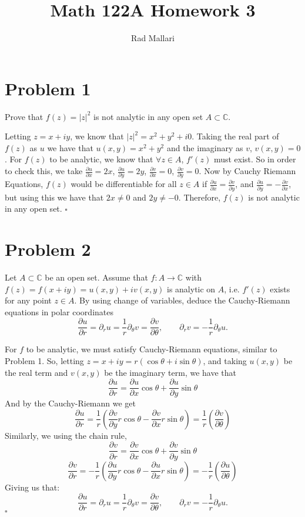 \documentclass[12pt]{article}
\title{Math 122A Homework 3}
\author{Rad Mallari}
\newcommand{\C}{\mathbb{C}}
\newenvironment{proof}{\noindent{\bf Proof.}}{\hfill $\square$\medskip}
\begin{document}
\maketitle

\section{Problem 1}
Prove that $f(z)=\lvert z\rvert^{2}$ is not analytic in any open set $A\subset\C$.

\begin{proof}
Letting $z=x+iy$, we know that $\lvert z\rvert^{2}=x^{2}+y^{2}+i0$. Taking the real part of $f(z)$ as $u$ we have that $u(x,y)=x^{2}+y^{2}$ and the imaginary as $v$, $v(x,y)=0$. For $f(z)$ to be analytic, we know that $\forall z\in A$, $f'(z)$ must exist. So in order to check this, we take $\frac{\partial u}{\partial x}=2x$, $\frac{\partial u}{\partial y}=2y$, $\frac{\partial v}{\partial x}=0$, $\frac{\partial v}{\partial y}=0$. Now by Cauchy Riemann Equations, $f(z)$ would be differentiable for all $z\in A$ if $\frac{\partial u}{\partial x}=\frac{\partial v}{\partial y}$, and $\frac{\partial u}{\partial y}=-\frac{\partial v}{\partial x}$, but using this we have that $2x\neq 0$ and $2y\neq -0$. Therefore, $f(z)$ is not analytic in any open set.
\end{proof}


\section{Problem 2}
Let $A\subset\C$ be an open set. Assume that $f:A\rightarrow\C$ with $f(z)=f(x+iy)=u(x,y)+iv(x,y)$ is analytic on $A$, i.e. $f'(z)$ exists for any point $z\in A$. By using change of variables, deduce the Cauchy-Riemann equations in polar coordinates
$$\frac{\partial u}{\partial r}=\partial_{r}u=\frac{1}{r}\partial_{\theta}v=\frac{\partial v}{\partial\theta},\qquad\partial_{r}v=-\frac{1}{r}\partial_{\theta}u.$$

\begin{proof}
For $f$ to be analytic, we must satisfy Cauchy-Riemann equations, similar to Problem 1. So, letting $z=x+iy=r(\cos\theta+i\sin\theta)$, and taking $u(x,y)$ be the real term and $v(x,y)$ be the imaginary term, we have that
$$\frac{\partial u}{\partial r}=\frac{\partial u}{\partial x}\cos\theta+\frac{\partial u}{\partial y}\sin\theta$$
And by the Cauchy-Riemann we get
$$\frac{\partial u}{\partial r}=\frac{1}{r}(\frac{\partial v}{\partial y}r\cos\theta-\frac{\partial v}{\partial x}r\sin\theta)=\frac{1}{r}(\frac{\partial v}{\partial\theta})$$
Similarly, we using the chain rule,
$$\frac{\partial v}{\partial r}=\frac{\partial v}{\partial x}\cos\theta+\frac{\partial v}{\partial y}\sin\theta$$
$$\frac{\partial v}{\partial r}=-\frac{1}{r}(\frac{\partial u}{\partial y}r\cos\theta-\frac{\partial u}{\partial x}r\sin\theta)=-\frac{1}{r}(\frac{\partial u}{\partial\theta})$$
Giving us that:
$$\frac{\partial u}{\partial r}=\partial_{r}u=\frac{1}{r}\partial_{\theta}v=\frac{\partial v}{\partial\theta},\qquad\partial_{r}v=-\frac{1}{r}\partial_{\theta}u.$$
\end{proof}
\end{document}
